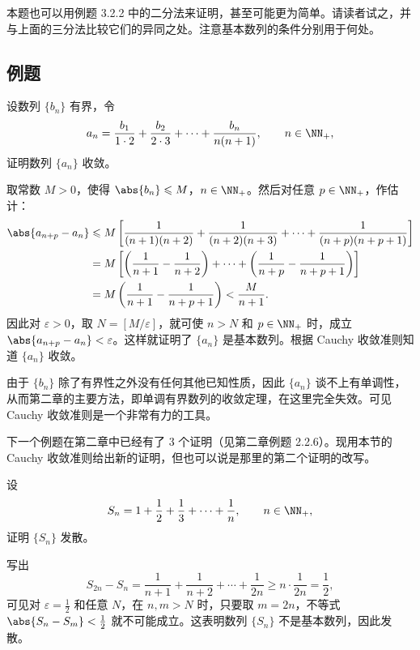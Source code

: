 \begin{xremark}
本题也可以用例题 3.2.2 中的二分法来证明，甚至可能更为简单。请读者试之，并与上面的三分法比较它们的异同之处。注意基本数列的条件分别用于何处。
\end{xremark}

\subsection{例题}

\begin{xexample}[3.4.1]
设数列 $\{b_n\}$ 有界，令
\[
  a_n=\frac{b_1}{1\cdot2}+\frac{b_2}{2\cdot3}+\cdots+\frac{b_n}{n(n+1)},\qquad n\in\NN_+,
\]
证明数列 $\{a_n\}$ 收敛。
\end{xexample}
\begin{xproof}
取常数 $M>0$，使得 $\abs{b_n}\leqslant M$，$n\in\NN_+$。然后对任意 $p\in\NN_+$，作估计：
\begin{align*}
  \abs{a_{n+p}-a_n}
  &\leqslant M\left[\frac1{(n+1)(n+2)}+\frac1{(n+2)(n+3)}+\cdots+\frac1{(n+p)(n+p+1)}\right]\\
  &=M\left[\left(\frac1{n+1}-\frac1{n+2}\right)+\cdots+\left(\frac1{n+p}-\frac1{n+p+1}\right)\right]\\
  &=M\left(\frac1{n+1}-\frac1{n+p+1}\right)<\frac{M}{n+1}.
\end{align*}
因此对 $\varepsilon>0$，取 $N=[M/\varepsilon]$，就可使 $n>N$ 和 $p\in\NN_+$ 时，成立 $\abs{a_{n+p}-a_n}<\varepsilon$。这样就证明了 $\{a_n\}$ 是基本数列。根据 Cauchy 收敛准则知道 $\{a_n\}$ 收敛。
\end{xproof}

\begin{xremark}
由于 $\{b_n\}$ 除了有界性之外没有任何其他已知性质，因此 $\{a_n\}$ 谈不上有单调性，从而第二章的主要方法，即单调有界数列的收敛定理，在这里完全失效。可见 Cauchy 收敛准则是一个非常有力的工具。
\end{xremark}

下一个例题在第二章中已经有了 3 个证明（见第二章例题 2.2.6）。现用本节的 Cauchy 收敛准则给出新的证明，但也可以说是那里的第二个证明的改写。

\begin{xexample}[3.4.2]
设
\[
  S_n=1+\frac12+\frac13+\cdots+\frac1n,\qquad n\in\NN_+,
\]
证明 $\{S_n\}$ 发散。
\end{xexample}
\begin{xproof}
写出
\[
  S_{2n}-S_n=\frac1{n+1}+\frac1{n+2}+\cdots+\frac1{2n}
  \geqslant n\cdot\frac1{2n}=\frac12,
\]
可见对 $\varepsilon=\frac12$ 和任意 $N$，在 $n,m>N$ 时，只要取 $m=2n$，不等式 $\abs{S_n-S_m}<\frac12$ 就不可能成立。这表明数列 $\{S_n\}$ 不是基本数列，因此发散。
\end{xproof}

